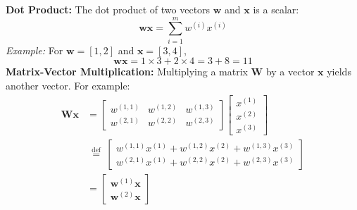\textbf{Dot Product:}
The dot product of two vectors \( \mathbf{w} \) and \( \mathbf{x} \) is a scalar:
\[ \mathbf{w} \mathbf{x} = \sum_{i=1}^{m} w^{(i)} x^{(i)} \]
\emph{Example:} For \( \mathbf{w} = [1, 2] \) and \( \mathbf{x} = [3, 4] \),
\[ \mathbf{w} \mathbf{x} = 1 \times 3 + 2 \times 4 = 3 + 8 = 11 \]
\textbf{Matrix-Vector Multiplication:}
Multiplying a matrix \( \mathbf{W} \) by a vector \( \mathbf{x} \) yields another vector. For example:
$$
	\begin{aligned}
		\mathbf{W} \mathbf{x} & =\left[\begin{array}{lll}
				                               w^{(1,1)} & w^{(1,2)} & w^{(1,3)} \\
				                               w^{(2,1)} & w^{(2,2)} & w^{(2,3)}
			                               \end{array}\right]\left[\begin{array}{l}
				                                                       x^{(1)} \\
				                                                       x^{(2)} \\
				                                                       x^{(3)}
			                                                       \end{array}\right]                                      \\
		                      & \stackrel{\text { def }}{=}\left[\begin{array}{l}
				                                                         w^{(1,1)} x^{(1)}+w^{(1,2)} x^{(2)}+w^{(1,3)} x^{(3)} \\
				                                                         w^{(2,1)} x^{(1)}+w^{(2,2)} x^{(2)}+w^{(2,3)} x^{(3)}
			                                                         \end{array}\right] \\
		                      & =\left[\begin{array}{l}
				                               \mathbf{w}^{(1)} \mathbf{x} \\
				                               \mathbf{w}^{(2)} \mathbf{x}
			                               \end{array}\right]
	\end{aligned}
$$

